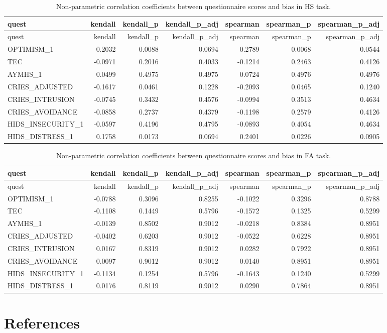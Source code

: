 \documentclass[]{article}
\begin{document}
\begin{longtable}[]{@{}lrrrrrr@{}}
\caption{Non-parametric correlation coefficients between questionnaire
scores and bias in HS task.}\tabularnewline
\toprule
quest & kendall & kendall\_p & kendall\_p\_adj & spearman & spearman\_p
& spearman\_p\_adj\tabularnewline
\midrule
\endfirsthead
\toprule
quest & kendall & kendall\_p & kendall\_p\_adj & spearman & spearman\_p
& spearman\_p\_adj\tabularnewline
\midrule
\endhead
OPTIMISM\_1 & 0.2032 & 0.0088 & 0.0694 & 0.2789 & 0.0068 &
0.0544\tabularnewline
TEC & -0.0971 & 0.2016 & 0.4033 & -0.1214 & 0.2463 &
0.4126\tabularnewline
AYMHS\_1 & 0.0499 & 0.4975 & 0.4975 & 0.0724 & 0.4976 &
0.4976\tabularnewline
CRIES\_ADJUSTED & -0.1617 & 0.0461 & 0.1228 & -0.2093 & 0.0465 &
0.1240\tabularnewline
CRIES\_INTRUSION & -0.0745 & 0.3432 & 0.4576 & -0.0994 & 0.3513 &
0.4634\tabularnewline
CRIES\_AVOIDANCE & -0.0858 & 0.2737 & 0.4379 & -0.1198 & 0.2579 &
0.4126\tabularnewline
HIDS\_INSECURITY\_1 & -0.0597 & 0.4196 & 0.4795 & -0.0893 & 0.4054 &
0.4634\tabularnewline
HIDS\_DISTRESS\_1 & 0.1758 & 0.0173 & 0.0694 & 0.2401 & 0.0226 &
0.0905\tabularnewline
\bottomrule
\end{longtable}

\begin{longtable}[]{@{}lrrrrrr@{}}
\caption{Non-parametric correlation coefficients between questionnaire
scores and bias in FA task.}\tabularnewline
\toprule
quest & kendall & kendall\_p & kendall\_p\_adj & spearman & spearman\_p
& spearman\_p\_adj\tabularnewline
\midrule
\endfirsthead
\toprule
quest & kendall & kendall\_p & kendall\_p\_adj & spearman & spearman\_p
& spearman\_p\_adj\tabularnewline
\midrule
\endhead
OPTIMISM\_1 & -0.0788 & 0.3096 & 0.8255 & -0.1022 & 0.3296 &
0.8788\tabularnewline
TEC & -0.1108 & 0.1449 & 0.5796 & -0.1572 & 0.1325 &
0.5299\tabularnewline
AYMHS\_1 & -0.0139 & 0.8502 & 0.9012 & -0.0218 & 0.8384 &
0.8951\tabularnewline
CRIES\_ADJUSTED & -0.0402 & 0.6203 & 0.9012 & -0.0522 & 0.6228 &
0.8951\tabularnewline
CRIES\_INTRUSION & 0.0167 & 0.8319 & 0.9012 & 0.0282 & 0.7922 &
0.8951\tabularnewline
CRIES\_AVOIDANCE & 0.0097 & 0.9012 & 0.9012 & 0.0140 & 0.8951 &
0.8951\tabularnewline
HIDS\_INSECURITY\_1 & -0.1134 & 0.1254 & 0.5796 & -0.1643 & 0.1240 &
0.5299\tabularnewline
HIDS\_DISTRESS\_1 & 0.0176 & 0.8119 & 0.9012 & 0.0290 & 0.7864 &
0.8951\tabularnewline
\bottomrule
\end{longtable}

\newpage

\hypertarget{references}{%
\section*{References}\label{references}}
\end{document}

